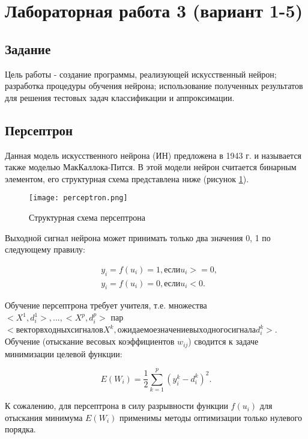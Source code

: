 \section{Лабораторная работа 3 (вариант 1-5)}

\subsection{Задание}
Цель работы - создание программы, реализующей искусственный нейрон; разработка процедуры обучения нейрона; использование полученных результатов для решения тестовых задач классификации и аппроксимации.

\subsection{Персептрон}
Данная модель искусственного нейрона (ИН) предложена в 1943 г. и называется также моделью МакКаллока-Пится. В этой модели нейрон считается бинарным элементом, его структурная схема представлена ниже (рисунок \ref{img:perceptron}).

\begin{figure}[H]
\centering
\texttt{[image: perceptron.png]}
\caption{Структурная схема персептрона}
\label{img:perceptron}
\end{figure}

Выходной сигнал нейрона может принимать только два значения {0, 1} по следующему правилу:

\begin{equation}\label{eq:system}
		\begin{aligned}
  			& y_i = f(u_i)=1, если u_i>=0, \\
  			& y_i = f(u_i)=0, если u_i<0.
		\end{aligned}  		
\end{equation}


Обучение персептрона требует учителя, т.е. множества ${<X^1, d^1_i>, ..., <X^p, d^p_i>}$ пар $<вектор входных сигналов X^k, ожидаемое значение выходного сигнала d^k_i>$. Обучение (отыскание весовых коэффициентов $w_{ij}$) сводится к задаче минимизации целевой функции:

\begin{equation}\label{eq:minFunc}
	E(W_i)=\dfrac{1}{2}\sum\limits_{k=1}^p(y^k_i-d^k_i)^2.
\end{equation}

К сожалению, для персептрона в силу разрывности функции $f(u_i)$ для отыскания минимума $E(W_i)$ применимы методы оптимизации только нулевого порядка.

